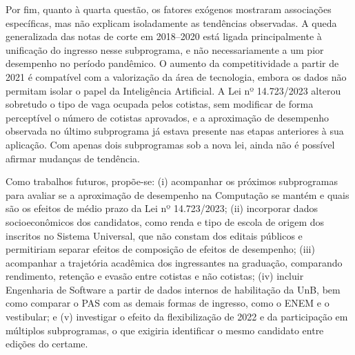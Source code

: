 Por fim, quanto à quarta questão, os fatores exógenos mostraram associações específicas, mas não explicam isoladamente as tendências observadas. A queda generalizada das notas de corte em 2018--2020 está ligada principalmente à unificação do ingresso nesse subprograma, e não necessariamente a um pior desempenho no período pandêmico. O aumento da competitividade a partir de 2021 é compatível com a valorização da área de tecnologia, embora os dados não permitam isolar o papel da Inteligência Artificial. A Lei nº 14.723/2023 alterou sobretudo o tipo de vaga ocupada pelos cotistas, sem modificar de forma perceptível o número de cotistas aprovados, e a aproximação de desempenho observada no último subprograma já estava presente nas etapas anteriores à sua aplicação. Com apenas dois subprogramas sob a nova lei, ainda não é possível afirmar mudanças de tendência.

Como trabalhos futuros, propõe-se: (i) acompanhar os próximos subprogramas para avaliar se a aproximação de desempenho na Computação se mantém e quais são os efeitos de médio prazo da Lei nº 14.723/2023; (ii) incorporar dados socioeconômicos dos candidatos, como renda e tipo de escola de origem dos inscritos no Sistema Universal, que não constam dos editais públicos e permitiriam separar efeitos de composição de efeitos de desempenho; (iii) acompanhar a trajetória acadêmica dos ingressantes na graduação, comparando rendimento, retenção e evasão entre cotistas e não cotistas; (iv) incluir Engenharia de Software a partir de dados internos de habilitação da UnB, bem como comparar o PAS com as demais formas de ingresso, como o ENEM e o vestibular; e (v) investigar o efeito da flexibilização de 2022 e da participação em múltiplos subprogramas, o que exigiria identificar o mesmo candidato entre edições do certame.
